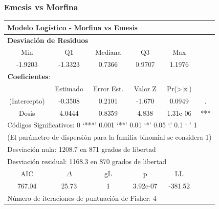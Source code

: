 \documentclass[10pt]{beamer}
\begin{document}
\begin{frame}
	\frametitle{Emesis vs Morfina}	
	\begin{table}[]
		\centering
		\small
		\begin{tabular}{|c|c|c|c|c|c|}
			\hline
			\multicolumn{6}{|l|}{\textbf{Modelo Logístico - Morfina vs Emesis}}                            \\ \hline
			\multicolumn{6}{|l|}{\textbf{{Desviación de Residuos}}}                                        \\ \hline
			    Min      &    Q1    &  Mediana   &    Q3    &          Max          &                      \\ \hline
			  -1.9203    & -1.3323  &   0.7366   &  0.9707  &        1.1976         &                      \\ \hline
			\multicolumn{6}{|l|}{\textbf{Coeficientes}:}                                                   \\ \hline
			             & Estimado & Error Est. & Valor Z  & Pr(\textgreater{}|z|) &                      \\ \hline
			(Intercepto) & -0.3508  &   0.2101   &  -1.670  &        0.0949         &          .           \\ \hline
			   Dosis     &  4.0444  &   0.8359   &  4.838   &       1.31e-06        &         ***          \\ \hline
			\multicolumn{6}{|l|}{Códigos Significativos:  0 ‘***’ 0.001 ‘**’ 0.01 ‘*’  0.05 ‘.’ 0.1 ‘ ’ 1} \\ \hline
			\multicolumn{6}{|l|}{(El parámetro de dispersión para la familia binomial se considera 1)}     \\ \hline
			\multicolumn{6}{|l|}{Desviación nula: 1208.7 en 871 grados de libertad}                        \\ \hline
			\multicolumn{6}{|l|}{Desviación residual: 1168.3 en 870 grados de libertad}                    \\ \hline
			    AIC      & $\Delta$ &     gL     &    p     &          LL           &                      \\ \hline
			   767.04    &  25.73   &     1      & 3.92e-07 &        -381.52        &                      \\ \hline
			\multicolumn{6}{|l|}{Número de iteraciones de puntuación de Fisher: 4}                         \\ \hline
		\end{tabular}
	\end{table}
\end{frame}
\end{document}
